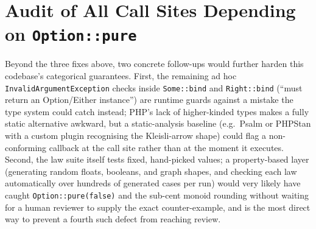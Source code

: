 \documentclass[a4paper,12pt,fleqn]{article}
\begin{document}
\newpage
\section{Audit of All Call Sites Depending on \texttt{Option::pure}}\label{sec:audit}




Beyond the three fixes above, two concrete follow-ups would further harden this codebase's categorical guarantees. First, the remaining ad hoc \texttt{InvalidArgumentException} checks inside \texttt{Some::bind} and \texttt{Right::bind} (``must return an Option/Either instance'') are runtime guards against a mistake the type system could catch instead; PHP's lack of higher-kinded types makes a fully static alternative awkward, but a static-analysis baseline (e.g.\ Psalm or PHPStan with a custom plugin recognising the Kleisli-arrow shape) could flag a non-conforming callback at the call site rather than at the moment it executes. Second, the law suite itself tests fixed, hand-picked values; a property-based layer (generating random floats, booleans, and graph shapes, and checking each law automatically over hundreds of generated cases per run) would very likely have caught \texttt{Option::pure(false)} and the sub-cent monoid rounding without waiting for a human reviewer to supply the exact counter-example, and is the most direct way to prevent a fourth such defect from reaching review.




\newpage
\begin{appendices}

\end{appendices}
\end{document}
